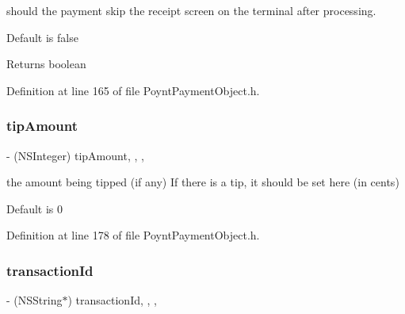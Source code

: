 should the payment skip the receipt screen on the terminal after processing. 

Default is false

\begin{DoxyReturn}{Returns}
boolean 
\end{DoxyReturn}


Definition at line 165 of file Poynt\+Payment\+Object.\+h.

\hypertarget{interface_poynt_payment_object_ae4a2e64d79032bc8bb25305486b23859}{}\label{interface_poynt_payment_object_ae4a2e64d79032bc8bb25305486b23859} 
\subsubsection{\texorpdfstring{tip\+Amount}{tipAmount}}
{\footnotesize\ttfamily -\/ (N\+S\+Integer) tip\+Amount\hspace{0.3cm}{\ttfamily [read]}, {\ttfamily [write]}, {\ttfamily [nonatomic]}, {\ttfamily [assign]}}



the amount being tipped (if any)  If there is a tip, it should be set here (in cents) 




Default is 0 

Definition at line 178 of file Poynt\+Payment\+Object.\+h.

\hypertarget{interface_poynt_payment_object_aacd11580c330a78310c344d78baecf8c}{}\label{interface_poynt_payment_object_aacd11580c330a78310c344d78baecf8c} 
\subsubsection{\texorpdfstring{transaction\+Id}{transactionId}}
{\footnotesize\ttfamily -\/ (N\+S\+String$\ast$) transaction\+Id\hspace{0.3cm}{\ttfamily [read]}, {\ttfamily [write]}, {\ttfamily [nonatomic]}, {\ttfamily [copy]}}




